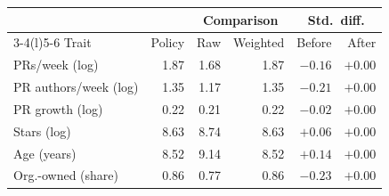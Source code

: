 \begin{tabular}{@{}lrrrrr@{}}
\toprule
 & & \multicolumn{2}{c}{Comparison} & \multicolumn{2}{c}{Std.\ diff.} \\
\cmidrule(lr){3-4}\cmidrule(l){5-6}
Trait & Policy & Raw & Weighted & Before & After \\
\midrule
PRs/week (log) & 1.87 & 1.68 & 1.87 & $-0.16$ & $+0.00$ \\
PR authors/week (log) & 1.35 & 1.17 & 1.35 & $-0.21$ & $+0.00$ \\
PR growth (log) & 0.22 & 0.21 & 0.22 & $-0.02$ & $+0.00$ \\
Stars (log) & 8.63 & 8.74 & 8.63 & $+0.06$ & $+0.00$ \\
Age (years) & 8.52 & 9.14 & 8.52 & $+0.14$ & $+0.00$ \\
Org.-owned (share) & 0.86 & 0.77 & 0.86 & $-0.23$ & $+0.00$ \\
\bottomrule
\end{tabular}
